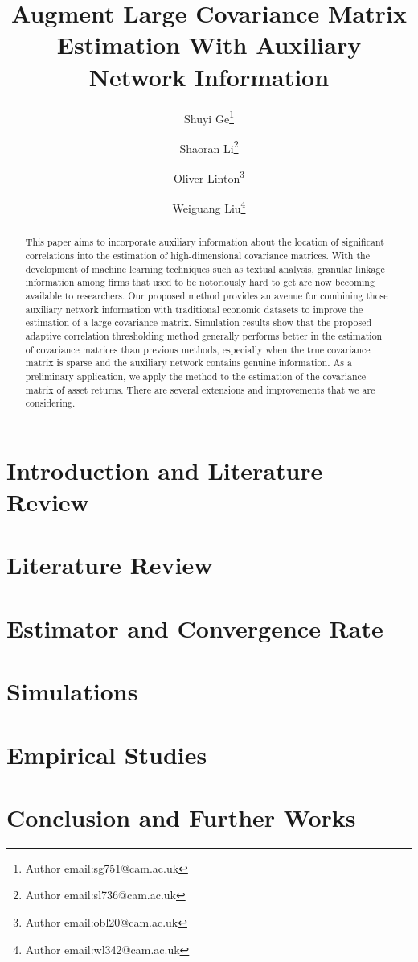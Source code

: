 \documentclass[12pt]{article}
\begin{document}
    \title{Augment Large Covariance Matrix Estimation With Auxiliary Network Information}
    \author[]{Shuyi Ge\thanks{Author email:sg751@cam.ac.uk}}
    \author[]{Shaoran Li\thanks{Author email:sl736@cam.ac.uk}}
    \author[]{Oliver Linton\thanks{Author email:obl20@cam.ac.uk}}
    \author[]{Weiguang Liu\thanks{Author email:wl342@cam.ac.uk}}
    \maketitle
    
    \begin{abstract}
        This paper aims to incorporate auxiliary information about the location of significant correlations into the estimation of high-dimensional covariance matrices. With the development of machine learning techniques such as textual analysis, granular linkage information among firms that used to be notoriously hard to get are now becoming available to researchers. Our proposed method provides an avenue for combining those auxiliary network information with traditional economic datasets to improve the estimation of a large covariance matrix. Simulation results show that the proposed adaptive correlation thresholding method generally performs better in the estimation of covariance matrices than previous methods, especially when the true covariance matrix is sparse and the auxiliary network contains genuine information. As a preliminary application, we apply the method to the estimation of the covariance matrix of asset returns. There are several extensions and improvements that we are considering.     
    \end{abstract}
    
    \section{Introduction and Literature Review}
    \section{Literature Review}
    \section{Estimator and Convergence Rate}
    \section{Simulations} 
    \section{Empirical Studies}
    \section{Conclusion and Further Works}

\printbibliography
\end{document}
